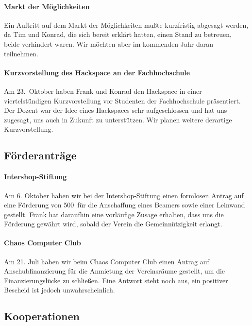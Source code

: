\documentclass[10pt,DIV16]{scrartcl}
\begin{document}
\paragraph{Markt der Möglichkeiten}

Ein Auftritt auf dem Markt der Möglichkeiten mußte kurzfristig abgesagt
werden, da Tim und Konrad, die sich bereit erklärt hatten, einen Stand zu
betreuen, beide verhindert waren.  Wir möchten aber im kommenden Jahr daran
teilnehmen.

\paragraph{Kurzvorstellung des Hackspace an der Fachhochschule}

Am 23.~Oktober haben Frank und Konrad den Hackspace in einer viertelstündigen
Kurzvorstellung vor Studenten der Fachhochschule präsentiert.  Der Dozent war
der Idee eines Hackspaces sehr aufgeschlossen und hat uns zugesagt, uns auch
in Zukunft zu unterstützen.  Wir planen weitere derartige Kurzvorstellung.

\subsection{Förderanträge}

\paragraph{Intershop-Stiftung}

Am 6. Oktober haben wir bei der Intershop-Stiftung einen formlosen
Antrag auf eine Förderung von 500\EUR\ für die Anschaffung eines
Beamers sowie einer Leinwand gestellt.  Frank hat daraufhin eine
vorläufige Zusage erhalten, dass uns die Förderung gewährt wird,
sobald der Verein die Gemeinnützigkeit erlangt.

\paragraph{Chaos Computer Club}

Am 21. Juli haben wir beim Chaos Computer Club einen Antrag auf
Anschubfinanzierung für die Anmietung der Vereinsräume gestellt, um die
Finanzierungslücke zu schließen. Eine Antwort steht noch aus, ein positiver
Bescheid ist jedoch unwahrscheinlich.


\subsection{Kooperationen}
\end{document}
